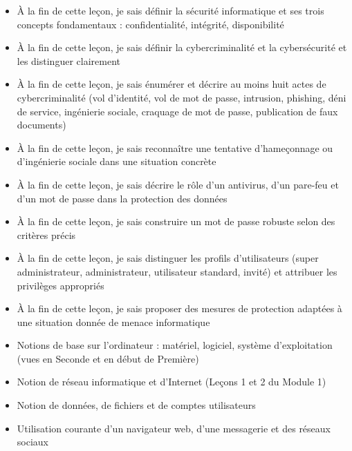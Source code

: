 \documentclass[11pt]{article}
\begin{document}
\begin{objectifs}
\begin{itemize}
\item À la fin de cette leçon, je sais définir la sécurité informatique et ses trois concepts fondamentaux : confidentialité, intégrité, disponibilité
\item À la fin de cette leçon, je sais définir la cybercriminalité et la cybersécurité et les distinguer clairement
\item À la fin de cette leçon, je sais énumérer et décrire au moins huit actes de cybercriminalité (vol d'identité, vol de mot de passe, intrusion, phishing, déni de service, ingénierie sociale, craquage de mot de passe, publication de faux documents)
\item À la fin de cette leçon, je sais reconnaître une tentative d'hameçonnage ou d'ingénierie sociale dans une situation concrète
\item À la fin de cette leçon, je sais décrire le rôle d'un antivirus, d'un pare-feu et d'un mot de passe dans la protection des données
\item À la fin de cette leçon, je sais construire un mot de passe robuste selon des critères précis
\item À la fin de cette leçon, je sais distinguer les profils d'utilisateurs (super administrateur, administrateur, utilisateur standard, invité) et attribuer les privilèges appropriés
\item À la fin de cette leçon, je sais proposer des mesures de protection adaptées à une situation donnée de menace informatique
\end{itemize}
\end{objectifs}

\begin{prerequis}
\begin{itemize}
\item Notions de base sur l'ordinateur : matériel, logiciel, système d'exploitation (vues en Seconde et en début de Première)
\item Notion de réseau informatique et d'Internet (Leçons 1 et 2 du Module 1)
\item Notion de données, de fichiers et de comptes utilisateurs
\item Utilisation courante d'un navigateur web, d'une messagerie et des réseaux sociaux
\end{itemize}
\end{prerequis}

\newpage
\end{document}
